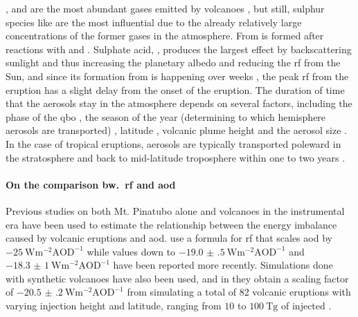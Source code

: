\documentclass{ametsocV5}
\newcommand{\iso}[1][i]{{#1}njected \ce{SO2}}
\begin{document}
,  and  are the most abundant gases emitted by volcanoes
\citep{robock2000}, but still, sulphur species like  are the most influential
due to the already relatively large concentrations of the former gases in the
atmosphere. From   is formed after reactions with  and 
\citep{robock2000}. Sulphate acid, , produces the largest effect by
backscattering sunlight and thus increasing the planetary albedo and reducing the
\ac{rf} from the Sun, and since its formation from  is happening over weeks
\citep{robock2000}, the peak \ac{rf} from the eruption has a slight delay from the onset
of the eruption. The duration of time that the  aerosols stay in the
atmosphere depends on several factors, including the phase of the \ac{qbo}
\citep{pitari2016b}, the season of the year (determining to which hemisphere aerosols
are transported) \citep{toohey2011,toohey2019}, latitude \citep{marshall2019,
  toohey2019}, volcanic plume height \citep{marshall2019} and the aerosol size
\citep{marshall2019}. In the case of tropical eruptions, aerosols are typically
transported poleward in the stratosphere and back to mid-latitude troposphere within one
to two years \citep{robock2000}.


\paragraph*{On the comparison bw.\ \acs*{rf} and \acs*{aod}}

Previous studies on both Mt. Pinatubo alone \citep{mills2017,hansen2005} and volcanoes
in the instrumental era \citep{gregory2016} have been used to estimate the relationship
between the energy imbalance caused by volcanic eruptions and \ac{aod}.
\citet{myhre2013} use a formula for \ac{rf} that scales \ac{aod} by
\(\SI{-25}{\watt\metre^{-2}\mathrm{AOD}^{-1}}\) while values down to
\(\SI{-19.0(5)}{\watt\metre^{-2}\mathrm{AOD}^{-1}}\) \citep{gregory2016} and
\(\SI{-18.3(10)}{\watt\metre^{-2}\mathrm{AOD}^{-1}}\) \citep{mills2017} have been
reported more recently. Simulations done with synthetic volcanoes have also been used,
and in \citet{marshall2020} they obtain a scaling factor of
\(\SI{-20.5(2)}{\watt\metre^{-2}\mathrm{AOD}^{-1}}\) from simulating a total of \(82\)
volcanic eruptions with varying injection height and latitude, ranging from \(10\) to
\(\SI{100}{\tera\gram}\) of \iso{}.
\end{document}
